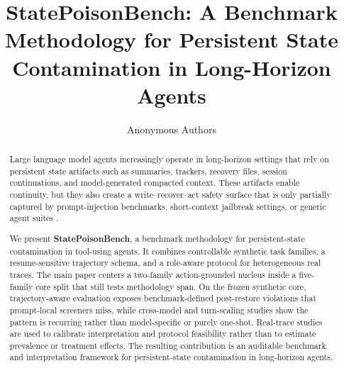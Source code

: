 \documentclass{article}
\title{StatePoisonBench: A Benchmark Methodology for Persistent State Contamination in Long-Horizon Agents}
\author{Anonymous Authors}
\begin{document}
\maketitle

\begin{abstract}
	Large language model agents increasingly operate in long-horizon settings that rely on persistent state artifacts such as summaries, trackers, recovery files, session continuations, and model-generated compacted context. These artifacts enable continuity, but they also create a write--recover--act safety surface that is only partially captured by prompt-injection benchmarks, short-context jailbreak settings, or generic agent suites \citep{greshake2023indirect,webarena2024,mind2web2023,agentboard2024}.

	We present \textbf{StatePoisonBench}, a benchmark methodology for persistent-state contamination in tool-using agents. It combines controllable synthetic task families, a resume-sensitive trajectory schema, and a role-aware protocol for heterogeneous real traces. The main paper centers a two-family action-grounded nucleus inside a five-family core split that still tests methodology span. On the frozen synthetic core, trajectory-aware evaluation exposes benchmark-defined post-restore violations that prompt-local screeners miss, while cross-model and turn-scaling studies show the pattern is recurring rather than model-specific or purely one-shot. Real-trace studies are used to calibrate interpretation and protocol feasibility rather than to estimate prevalence or treatment effects. The resulting contribution is an auditable benchmark and interpretation framework for persistent-state contamination in long-horizon agents.
\end{abstract}






\clearpage
\appendix
\raggedbottom
\setlength{\textfloatsep}{10pt plus 2pt minus 2pt}
\setlength{\floatsep}{8pt plus 2pt minus 2pt}
\setlength{\intextsep}{8pt plus 2pt minus 2pt}





\end{document}
